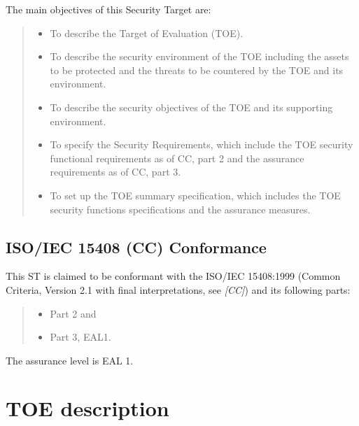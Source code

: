 \documentclass[12pt,english]{scrbook}
\begin{document}
The main objectives of this Security Target are:
\begin{quote}
\begin{itemize}
\item {} 
To describe the Target of Evaluation (TOE).

\item {} 
To describe the security environment of the TOE including the assets to
be protected and the threats to be countered by the TOE and its
environment.

\item {} 
To describe the security objectives of the TOE and its supporting
environment.

\item {} 
To specify the Security Requirements, which include the TOE security
functional requirements as of CC, part 2 and the assurance requirements as
of CC, part 3.

\item {} 
To set up the TOE summary specification, which includes the TOE
security functions specifications and the assurance measures.

\end{itemize}
\end{quote}





\section{ISO/IEC 15408 (CC) Conformance}

This ST is claimed to be conformant with the ISO/IEC 15408:1999 (Common
Criteria, Version 2.1 with final interpretations, see \emph{{[}CC]}) and its following
parts:
\begin{quote}
\begin{itemize}
\item {} 
Part 2 and

\item {} 
Part 3, EAL1.

\end{itemize}
\end{quote}

The assurance level is EAL 1.





\chapter{TOE description}
\end{document}
